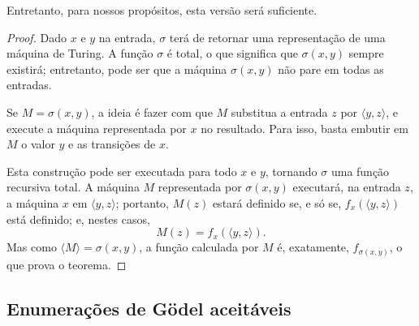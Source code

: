 Entretanto, para nossos propósitos,
esta versão será suficiente.

\begin{proof}
    Dado $x$ e $y$ na entrada,
    $\sigma$ terá de retornar uma representação de uma máquina de Turing.
    A função $\sigma$ é total,
    o que significa que $\sigma(x, y)$ sempre existirá;
    entretanto,
    pode ser que a máquina $\sigma(x, y)$ não pare em todas as entradas.

    Se $M = \sigma(x, y)$,
    a ideia é fazer com que $M$ substitua a entrada $z$ por $\langle y, z \rangle$,
    e execute a máquina representada por $x$ no resultado.
    Para isso,
    basta embutir em $M$ o valor $y$ e as transições de $x$.

    Esta construção pode ser executada para todo $x$ e $y$,
    tornando $\sigma$ uma função recursiva total.
    A máquina $M$ representada por $\sigma(x, y)$ executará,
    na entrada $z$, a máquina $x$ em $\langle y, z \rangle$;
    portanto,
    $M(z)$ estará definido se, e só se, $f_x(\langle y, z \rangle)$ está definido;
    e, nestes casos,
    \begin{equation*}
        M(z) = f_x( \langle y, z \rangle ).
    \end{equation*}
    Mas como $\langle M \rangle = \sigma(x, y)$,
    a função calculada por $M$ é, exatamente, $f_{\sigma(x, y)}$,
    o que prova o teorema.
\end{proof}

\subsection{Enumerações de Gödel aceitáveis}
\label{sec:acceptable_godel_numbering}
